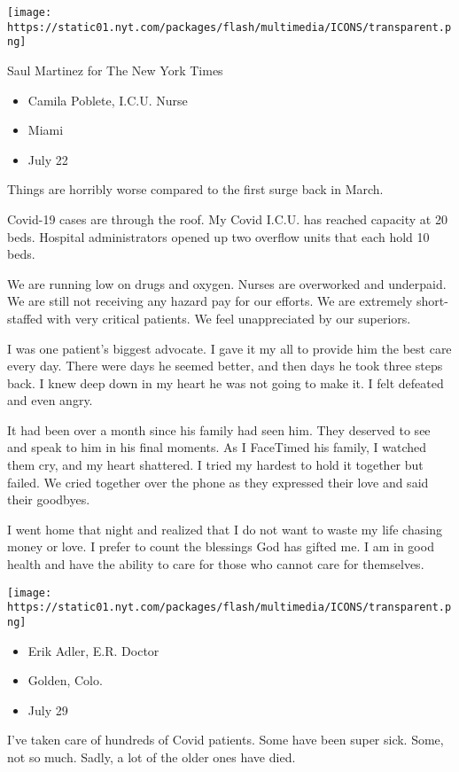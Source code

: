 \texttt{[image: https://static01.nyt.com/packages/flash/multimedia/ICONS/transparent.png]}

Saul Martinez for The New York Times

\begin{itemize}
\tightlist
\item
  Camila Poblete, I.C.U. Nurse
\item
  Miami
\item
  July 22
\end{itemize}

Things are horribly worse compared to the first surge back in March.

Covid-19 cases are through the roof. My Covid I.C.U. has reached
capacity at 20 beds. Hospital administrators opened up two overflow
units that each hold 10 beds.

We are running low on drugs and oxygen. Nurses are overworked and
underpaid. We are still not receiving any hazard pay for our efforts. We
are extremely short-staffed with very critical patients. We feel
unappreciated by our superiors.

I was one patient's biggest advocate. I gave it my all to provide him
the best care every day. There were days he seemed better, and then days
he took three steps back. I knew deep down in my heart he was not going
to make it. I felt defeated and even angry.

It had been over a month since his family had seen him. They deserved to
see and speak to him in his final moments. As I FaceTimed his family, I
watched them cry, and my heart shattered. I tried my hardest to hold it
together but failed. We cried together over the phone as they expressed
their love and said their goodbyes.

I went home that night and realized that I do not want to waste my life
chasing money or love. I prefer to count the blessings God has gifted
me. I am in good health and have the ability to care for those who
cannot care for themselves.

\texttt{[image: https://static01.nyt.com/packages/flash/multimedia/ICONS/transparent.png]}

\begin{itemize}
\tightlist
\item
  Erik Adler, E.R. Doctor
\item
  Golden, Colo.
\item
  July 29
\end{itemize}

I've taken care of hundreds of Covid patients. Some have been super
sick. Some, not so much. Sadly, a lot of the older ones have died.

